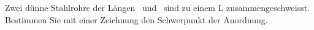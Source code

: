 Zwei dünne Stahlrohre der Längen \lLaO\ und \lLbO\ sind zu einem L zusammengeschweisst. Bestimmen Sie mit einer Zeichnung den Schwerpunkt der Anordnung.
